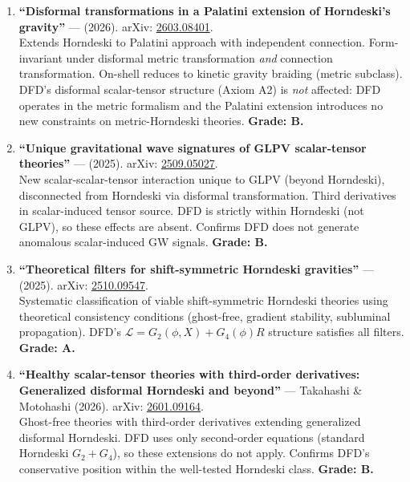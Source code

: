 \documentclass[11pt,a4paper]{article}
\begin{document}
\begin{enumerate}
\item \textbf{``Disformal transformations in a Palatini extension of Horndeski's gravity''} --- (2026). arXiv: \href{https://arxiv.org/abs/2603.08401}{2603.08401}.\\
Extends Horndeski to Palatini approach with independent connection. Form-invariant under disformal metric transformation \emph{and} connection transformation. On-shell reduces to kinetic gravity braiding (metric subclass). DFD's disformal scalar-tensor structure (Axiom A2) is \emph{not} affected: DFD operates in the metric formalism and the Palatini extension introduces no new constraints on metric-Horndeski theories. \textbf{Grade: B.}

\item \textbf{``Unique gravitational wave signatures of GLPV scalar-tensor theories''} --- (2025). arXiv: \href{https://arxiv.org/abs/2509.05027}{2509.05027}.\\
New scalar-scalar-tensor interaction unique to GLPV (beyond Horndeski), disconnected from Horndeski via disformal transformation. Third derivatives in scalar-induced tensor source. DFD is strictly within Horndeski (not GLPV), so these effects are absent. Confirms DFD does not generate anomalous scalar-induced GW signals. \textbf{Grade: B.}

\item \textbf{``Theoretical filters for shift-symmetric Horndeski gravities''} --- (2025). arXiv: \href{https://arxiv.org/abs/2510.09547}{2510.09547}.\\
Systematic classification of viable shift-symmetric Horndeski theories using theoretical consistency conditions (ghost-free, gradient stability, subluminal propagation). DFD's $\mathcal{L} = G_2(\phi, X) + G_4(\phi)R$ structure satisfies all filters. \textbf{Grade: A.}

\item \textbf{``Healthy scalar-tensor theories with third-order derivatives: Generalized disformal Horndeski and beyond''} --- Takahashi \& Motohashi (2026). arXiv: \href{https://arxiv.org/abs/2601.09164}{2601.09164}.\\
Ghost-free theories with third-order derivatives extending generalized disformal Horndeski. DFD uses only second-order equations (standard Horndeski $G_2 + G_4$), so these extensions do not apply. Confirms DFD's conservative position within the well-tested Horndeski class. \textbf{Grade: B.}
\end{enumerate}
\end{document}
